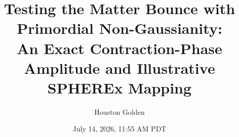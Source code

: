 \documentclass[aps,prd,twocolumn,superscriptaddress,showpacs,preprintnumbers,nofootinbib,longbibliography,floatfix]{revtex4-2}
\begin{document}

\title{Testing the Matter Bounce with Primordial Non-Gaussianity:\\
An Exact Contraction-Phase Amplitude and Illustrative SPHEREx Mapping}

\author{Houston Golden}

\date{July 14, 2026, 11:55 AM PDT}
\end{document}
